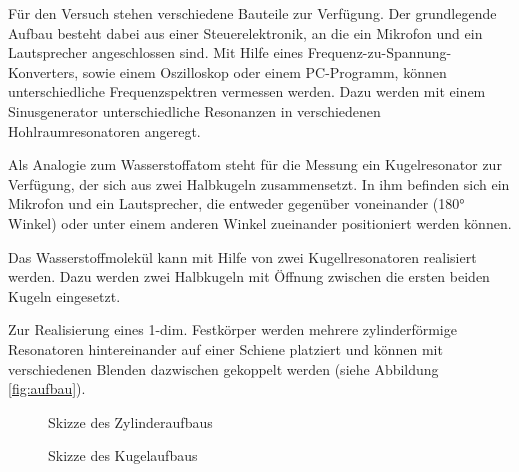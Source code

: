 Für den Versuch stehen verschiedene Bauteile zur Verfügung. Der grundlegende Aufbau besteht dabei aus einer Steuerelektronik,
an die ein Mikrofon und ein Lautsprecher angeschlossen sind. Mit Hilfe eines Frequenz-zu-Spannung-Konverters, sowie einem
Oszilloskop oder einem PC-Programm, können unterschiedliche Frequenzspektren vermessen werden. Dazu werden mit einem
Sinusgenerator unterschiedliche Resonanzen in verschiedenen Hohlraumresonatoren angeregt.

Als Analogie zum Wasserstoffatom steht für die Messung ein Kugelresonator zur Verfügung, der sich aus zwei Halbkugeln
zusammensetzt. In ihm befinden sich ein Mikrofon und ein Lautsprecher, die entweder gegenüber voneinander (180° Winkel)
oder unter einem anderen Winkel zueinander positioniert werden können.

Das Wasserstoffmolekül kann mit Hilfe von zwei Kugellresonatoren realisiert werden. Dazu werden zwei Halbkugeln mit Öffnung
zwischen die ersten beiden Kugeln eingesetzt.

Zur Realisierung eines 1-dim. Festkörper werden mehrere zylinderförmige Resonatoren hintereinander auf einer Schiene platziert
und können mit verschiedenen Blenden dazwischen gekoppelt werden (siehe Abbildung \ref{fig:aufbau}).

\begin{figure}[H]
  \centering
  \caption{Skizze des Zylinderaufbaus}
  \label{fig:aufbau_zylinder}
\end{figure}

\begin{figure}[H]
  \centering
  \caption{Skizze des Kugelaufbaus}
  \label{fig:aufbau_kugel}
\end{figure}

